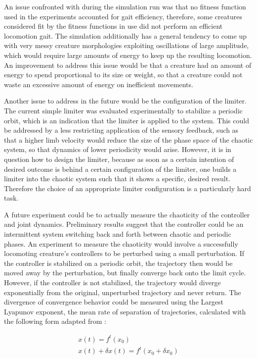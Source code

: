 \documentclass[main]{subfiles}
\begin{document}
An issue confronted with during the simulation run was that no fitness function used in the experiments accounted for gait efficiency, therefore, some creatures considered fit by the fitness functions in use did not perform an efficient locomotion gait. %
%
The simulation additionally has a general tendency to come up with very messy creature morphologies exploiting oscillations of large amplitude, which would require large amounts of energy to keep up the resulting locomotion. %
%
An improvement to address this issue would be that a creature had an amount of energy to spend proportional to its size or weight, so that a creature could not waste an excessive amount of energy on inefficient movements. 

Another issue to address in the future would be the configuration of the limiter. %
%
The current simple limiter was evaluated experimentally to stabilize a periodic orbit, which is an indication that the limiter is applied to the system. %
%
This could be addressed by a less restricting application of the sensory feedback, such as that a higher limb velocity would reduce the size of the phase space of the chaotic system, so that dynamics of lower periodicity would arise. %
%
However, it is in question how to design the limiter, because as soon as a certain intention of desired outcome is behind a certain configuration of the limiter, one builds a limiter into the chaotic system such that it shows a specific, desired result. %
%
Therefore the choice of an appropriate limiter configuration is a particularly hard task.

A future experiment could be to actually measure the chaoticity of the controller and joint dynamics. %
%
Preliminary results suggest that the controller could be an intermittent system switching back and forth between chaotic and periodic phases. %
%
An experiment to measure the chaoticity would involve a successfully locomoting creature's controllers to be perturbed using a small perturbation. %
%
If the controller is stabilized on a periodic orbit, the trajectory then would be moved away by the perturbation, but finally converge back onto the limit cycle. %
%
However, if the controller is not stabilized, the trajectory would diverge exponentially from the original, unperturbed trajectory and never return. %
%
The divergence of convergence behavior could be measured using the Largest Lyapunov exponent, the mean rate of separation of trajectories, calculated with the following form adapted from \cite{bib:Rosenstein1993}:

\begin{align*}
x(t) = f^t(x_0)\\
x(t) + \delta x(t) = f^t(x_0 + \delta x_0)\\
\end{align*}
\end{document}
